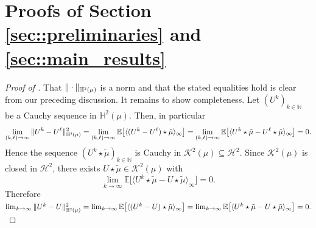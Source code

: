 \documentclass[10pt]{article} %
\newcommand\cH{\mathcal H}
\newcommand\cK{\mathcal K}
\newcommand{\smalltext}[1]{\text{\fontsize{4}{4}\selectfont$#1$}}
\def \E{\mathbb{E}}
\def \H{\mathbb{H}}
\def \N{\mathbb{N}}
\begin{document}
\appendix

\section{Proofs of Section \ref{sec::preliminaries} and \ref{sec::main_results}}\label{app::proofs_preliminaries}

\begin{proof}[Proof of ]\label{proof::completeness_ivm}
	That $\|\cdot\|_{\H^\smalltext{2}(\mu)}$ is a norm and that the stated equalities hold is clear from our preceding discussion. It remains to show completeness. Let $(U^k)_{k \in \N}$ be a Cauchy sequence in $\H^2(\mu)$. 
	Then, in particular
	\begin{equation*}
		\lim_{(k,\ell) \rightarrow \infty}\|U^k - U^\ell\|^2_{\H^\smalltext{2}(\mu)} = \lim_{(k,\ell) \rightarrow \infty}\E\big[\langle (U^k - U^\ell) \star \tilde\mu\rangle_\infty \big] = \lim_{(k,\ell) \rightarrow \infty}\E\big[\langle U^k \star \tilde\mu - U^\ell \star \tilde\mu\rangle_\infty \big] = 0.
	\end{equation*}
	Hence the sequence $(U^k \star \tilde\mu)_{k \in \N}$ is Cauchy in $\cK^2(\mu) \subseteq \cH^2$. Since $\cK^2(\mu)$ is closed in $\cH^2$, there exists $U \star \tilde\mu \in \cK^2(\mu)$ with
	\begin{equation*}
		\lim_{k \rightarrow \infty}\E\big[\langle U^k \star \tilde\mu - U \star \tilde\mu \rangle_\infty \big] = 0.
	\end{equation*}
	Therefore $\lim_{k \rightarrow \infty}\|U^k - U\|^2_{\H^\smalltext{2}(\mu)} = \lim_{k \rightarrow \infty}\E\big[\langle (U^k - U) \star \tilde\mu\rangle_\infty \big] = \lim_{k \rightarrow \infty}\E\big[\langle U^k \star \tilde\mu - U \star \tilde\mu\rangle_\infty \big]= 0.$
\end{proof}
\end{document}

